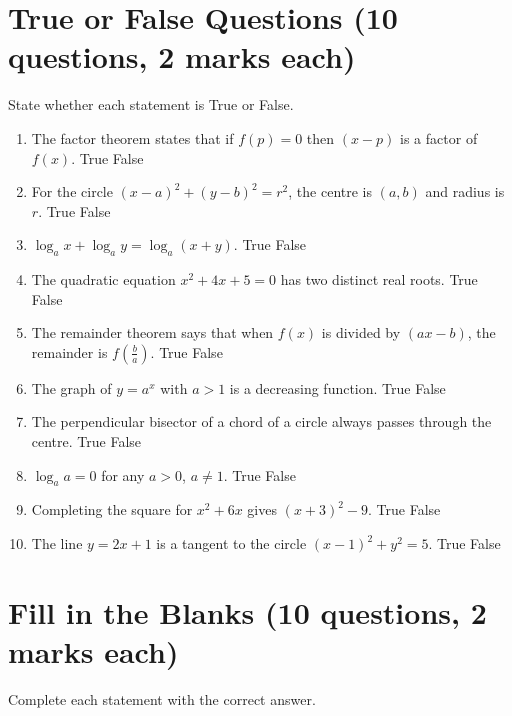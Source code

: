 \documentclass{../Templates/sbs-exam}
\begin{document}
\section*{True or False Questions (10 questions, 2 marks each)}
State whether each statement is True or False.

\begin{enumerate}
    \item The factor theorem states that if $f(p)=0$ then $(x-p)$ is a factor of $f(x)$. \hfill True \quad False
    
    \item For the circle $(x-a)^2 + (y-b)^2 = r^2$, the centre is $(a,b)$ and radius is $r$. \hfill True \quad False
    
    \item $\log_a x + \log_a y = \log_a (x+y)$. \hfill True \quad False
    
    \item The quadratic equation $x^2 + 4x + 5 = 0$ has two distinct real roots. \hfill True \quad False
    
    \item The remainder theorem says that when $f(x)$ is divided by $(ax-b)$, the remainder is $f\left(\frac{b}{a}\right)$. \hfill True \quad False
    
    \item The graph of $y = a^x$ with $a>1$ is a decreasing function. \hfill True \quad False
    
    \item The perpendicular bisector of a chord of a circle always passes through the centre. \hfill True \quad False
    
    \item $\log_a a = 0$ for any $a>0$, $a\neq 1$. \hfill True \quad False
    
    \item Completing the square for $x^2+6x$ gives $(x+3)^2 - 9$. \hfill True \quad False
    
    \item The line $y = 2x + 1$ is a tangent to the circle $(x-1)^2 + y^2 = 5$. \hfill True \quad False
\end{enumerate}

\section*{Fill in the Blanks (10 questions, 2 marks each)}
Complete each statement with the correct answer.
\end{document}
